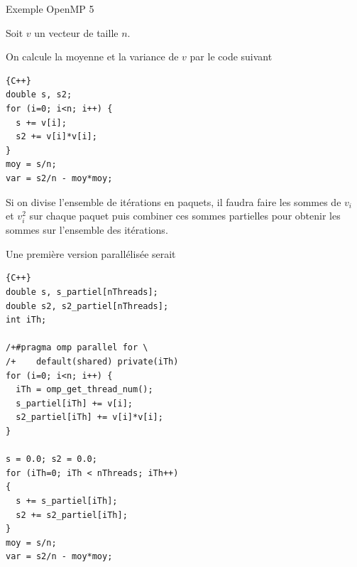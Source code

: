 \documentclass{beamer}
\begin{document}
\begin{frame}[fragile]
	Exemple OpenMP 5
	\vfill
	
	Soit $v$ un vecteur de taille $n$.
	
	\vfill
	On calcule la moyenne et la variance de $v$ par le code suivant
	
\begin{lstlisting}{C++}
double s, s2;
for (i=0; i<n; i++) {
  s += v[i];
  s2 += v[i]*v[i];
}
moy = s/n;
var = s2/n - moy*moy;
\end{lstlisting}
	\vfill

Si on divise l'ensemble de itérations en paquets, il faudra faire les sommes de $v_i$ et $v_i^2$ sur chaque paquet puis combiner ces sommes partielles pour obtenir les sommes sur l'ensemble des itérations.	\vfill

\end{frame}

\begin{frame}[fragile]
	Une première version parallélisée serait
	
	\vfill
\begin{lstlisting}{C++}
double s, s_partiel[nThreads];
double s2, s2_partiel[nThreads];
int iTh;

/+#pragma omp parallel for \
/+    default(shared) private(iTh)
for (i=0; i<n; i++) {
  iTh = omp_get_thread_num();
  s_partiel[iTh] += v[i];
  s2_partiel[iTh] += v[i]*v[i];
}

s = 0.0; s2 = 0.0;
for (iTh=0; iTh < nThreads; iTh++)
{
  s += s_partiel[iTh];
  s2 += s2_partiel[iTh];
}
moy = s/n;
var = s2/n - moy*moy;
\end{lstlisting}
\vfill
	
\end{frame}
\end{document}
